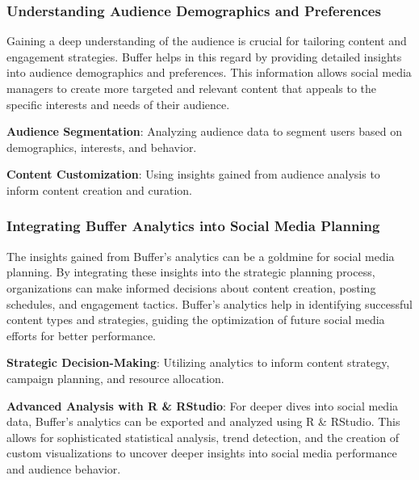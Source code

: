 \documentclass[
]{book}
\begin{document}
\hypertarget{understanding-audience-demographics-and-preferences}{%
\subsubsection*{Understanding Audience Demographics and Preferences}\label{understanding-audience-demographics-and-preferences}}

Gaining a deep understanding of the audience is crucial for tailoring content and engagement strategies. Buffer helps in this regard by providing detailed insights into audience demographics and preferences. This information allows social media managers to create more targeted and relevant content that appeals to the specific interests and needs of their audience.

\textbf{Audience Segmentation}: Analyzing audience data to segment users based on demographics, interests, and behavior.

\textbf{Content Customization}: Using insights gained from audience analysis to inform content creation and curation.

\hypertarget{integrating-buffer-analytics-into-social-media-planning}{%
\subsubsection*{Integrating Buffer Analytics into Social Media Planning}\label{integrating-buffer-analytics-into-social-media-planning}}

The insights gained from Buffer's analytics can be a goldmine for social media planning. By integrating these insights into the strategic planning process, organizations can make informed decisions about content creation, posting schedules, and engagement tactics. Buffer's analytics help in identifying successful content types and strategies, guiding the optimization of future social media efforts for better performance.

\textbf{Strategic Decision-Making}: Utilizing analytics to inform content strategy, campaign planning, and resource allocation.

\textbf{Advanced Analysis with R \& RStudio}: For deeper dives into social media data, Buffer's analytics can be exported and analyzed using R \& RStudio. This allows for sophisticated statistical analysis, trend detection, and the creation of custom visualizations to uncover deeper insights into social media performance and audience behavior.
\end{document}
